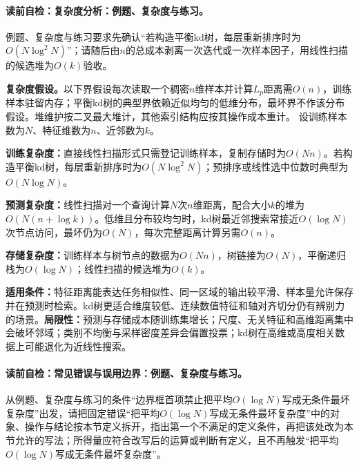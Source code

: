 \label{struct:V2-C02-CH26}
\label{struct:V2-C02-CH27}
\paragraph{读前自检：复杂度分析：例题、复杂度与练习。}例题、复杂度与练习要求先确认“若构造平衡kd树，每层重新排序时为$O(N\log^2N)$”；请随后由$n$的总成本剥离一次迭代或一次样本因子，用线性扫描的候选堆为$O(k)$验收。\par

\begin{complexitybox}
\textbf{复杂度假设。}以下界假设每次读取一个稠密$n$维样本并计算$L_p$距离需$O(n)$，训练样本驻留内存；平衡kd树的典型界依赖近似均匀的低维分布，最坏界不作该分布假设。堆维护按二叉最大堆计，其他索引结构应按其操作成本重计。
设训练样本数为$N$、特征维数为$n$、近邻数为$k$。

\textbf{训练复杂度：}直接线性扫描形式只需登记训练样本，复制存储时为$O(Nn)$。若构造平衡kd树，每层重新排序时为$O(N\log^2N)$；预排序或线性选中位数时典型为$O(N\log N)$。

\textbf{预测复杂度：}线性扫描对一个查询计算$N$次$n$维距离，配合大小$k$的堆为$O(N(n+\log k))$。低维且分布较均匀时，kd树最近邻搜索常接近$O(\log N)$次节点访问，最坏仍为$O(N)$，每次完整距离计算另需$O(n)$。

\textbf{存储复杂度：}训练样本与树节点的数据为$O(Nn)$，树链接为$O(N)$，平衡递归栈为$O(\log N)$；线性扫描的候选堆为$O(k)$。
\end{complexitybox}

\label{struct:V2-C02-CH28}
\label{struct:V2-C02-CH29}
\begin{applicabilitybox}
\textbf{适用条件：}特征距离能表达任务相似性、同一区域的输出较平滑、样本量允许保存并在预测时检索。kd树更适合维度较低、连续数值特征和轴对齐切分仍有辨别力的场景。\textbf{局限性：}预测与存储成本随训练集增长；尺度、无关特征和高维距离集中会破坏邻域；类别不均衡与采样密度差异会偏置投票；kd树在高维或高度相关数据上可能退化为近线性搜索。
\end{applicabilitybox}

\label{struct:V2-C02-CH30}
\paragraph{读前自检：常见错误与误用边界：例题、复杂度与练习。}从例题、复杂度与练习的条件“边界框首项禁止把平均$O(\log N)$写成无条件最坏复杂度”出发，请把固定错误“把平均$O(\log N)$写成无条件最坏复杂度”中的对象、操作与结论按本节定义拆开，指出第一个不满足的定义条件，再把该处改为本节允许的写法；所得量应符合改写后的运算或判断有定义，且不再触发“把平均$O(\log N)$写成无条件最坏复杂度”。\par

